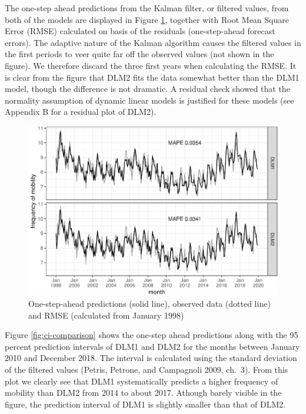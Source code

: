 \documentclass[]{article}
\begin{document}
The one-step ahead predictions from the Kalman filter, or filtered
values, from both of the models are displayed in Figure
\ref{fig:dlm-filtered}, together with Root Mean Square Error (RMSE)
calculated on basis of the residuals (one-step-ahead forecast errors).
The adaptive nature of the Kalman algorithm causes the filtered values
in the first periods to veer quite far off the observed values (not
shown in the figure). We therefore discard the three first years when
calculating the RMSE. It is clear from the figure that DLM2 fits the
data somewhat better than the DLM1 model, though the difference is not
dramatic. A residual check showed that the normality assumption of
dynamic linear models is justified for these models (see Appendix B for
a residual plot of DLM2).

\begin{figure}
\centering
\includegraphics{../figs/freq--dlm-filtered-1.pdf}
\caption{\label{fig:dlm-filtered}One-step-ahead predictions (solid line),
observed data (dotted line) and RMSE (calculated from January 1998)}
\end{figure}

Figure \ref{fig:ci-comparison} shows the one-step ahead predictions
along with the 95 percent prediction intervals of DLM1 and DLM2 for the
months between January 2010 and December 2018. The interval is
calculated using the standard deviation of the filtered values (Petris,
Petrone, and Campagnoli 2009, ch.~3). From this plot we clearly see that
DLM1 systematically predicts a higher frequency of mobility than DLM2
from 2014 to about 2017. Athough barely visible in the figure, the
prediction interval of DLM1 is slightly smaller than that of DLM2.
\end{document}
